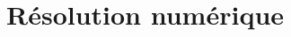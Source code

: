 \documentclass[resume]{subfiles}
\begin{document}
    \section{Résolution numérique}


    
\end{document}
